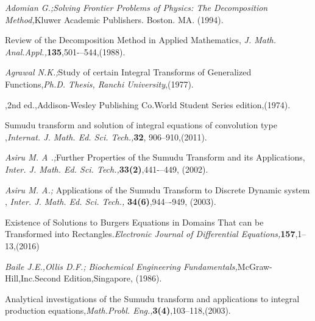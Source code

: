 
\pagestyle{fancy}
\renewcommand{\sectionmark}[1]{\markright{#1}}
\chead{} 
\renewcommand{\headrulewidth}{0.01pt}
\renewcommand{\footrulewidth}{0.01pt}

\begin{thebibliography}{00}

 {\sl Adomian G.;}{\it Solving Frontier Problems of Physics: The Decomposition Method,}Kluwer Academic Publishers. Boston. MA. (1994).

 Review of the Decomposition Method in Applied Mathematics, {\it J. Math. Anal.Appl.,}{\bf 135},501-–544,(1988).


 {\sl Agrawal N.K.;}Study of certain Integral Transforms of Generalized Functions,{\it Ph.D. Thesis, Ranchi University},(1977).

,2nd ed.,Addison-Wesley Publishing
Co.World Student Series edition,(1974).

 Sumudu transform and solution of integral equations of convolution type ,{\it Internat. J. Math. Ed. Sci. Tech.,}{\bf 32}, 906--910,(2011).

 {\sl Asiru M. A .;}Further Properties of the Sumudu Transform and its Applications, {\it Inter. J. Math. Ed. Sci. Tech.,}{\bf 33(2)},441-–449, (2002).

 {\sl Asiru M. A.;} Applications of the Sumudu Transform to Discrete Dynamic system ,
{\it Inter. J. Math. Ed. Sci. Tech.,} {\bf 34(6)},944–-949, (2003).

Existence of Solutions to Burgers Equations in Domains That can be Transformed into Rectangles.{\it Electronic Journal of Differential Equations,}{\bf 157},1--13,(2016)

 {\sl Baile J.E.,Ollis D.F.;}  {\it Biochemical Engineering Fundamentals,}McGraw-Hill,Inc.Second Edition,Singapore, (1986).

 
Analytical investigations of
the Sumudu transform and applications to integral production equations,{\it Math.Probl. Eng.,}{\bf 3(4)},103--118,(2003).


\end{thebibliography}
